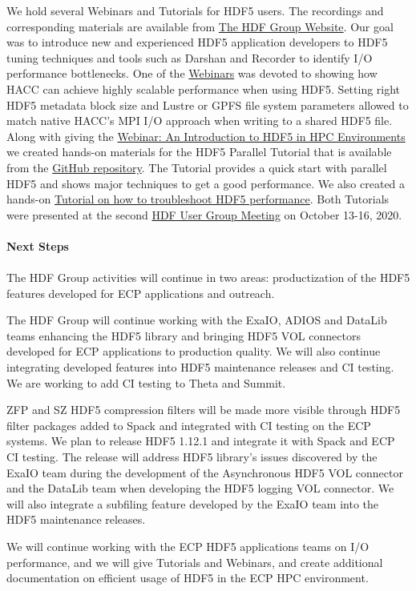 We hold several Webinars and Tutorials for HDF5 users. The recordings and corresponding materials are available from \href{http://https://www.hdfgroup.org/category/webinar} {The HDF Group Website}. Our goal was to introduce new and experienced HDF5 application developers to HDF5 tuning techniques and tools such as Darshan and Recorder to identify I/O performance bottlenecks. One of the \href{https://www.hdfgroup.org/2020/08/a-study-of-hacc-io-benchmarks/}{Webinars} was devoted to showing how HACC can achieve highly scalable performance when using HDF5. Setting right HDF5 metadata block size and Lustre or GPFS file system parameters allowed to match native HACC's MPI I/O approach when writing to a shared HDF5 file.
Along with giving the \href{https://www.hdfgroup.org/2020/06/webinar-an-introduction-to-hdf5-in-hpc-environments-supporting-materials/}{Webinar: An Introduction to HDF5 in HPC Environments} we created hands-on materials for the HDF5 Parallel Tutorial that is available from the \href{https://github.com/HDFGroup/Tutorial/tree/main/Parallel-hands-on-tutorial}{GitHub repository}. The Tutorial provides a quick start with parallel HDF5 and shows major techniques to get a good performance. We also created a hands-on \href{https://github.com/HDFGroup/Tutorial/tree/main/HDF5-troubleshooting}{Tutorial on how to troubleshoot HDF5 performance}. Both Tutorials were presented at the second \href{https://www.hdfgroup.org/hug/2020-hug/hdf5-users-group-2020-agenda/}{HDF User Group Meeting} on October 13-16, 2020. 
\paragraph{Next Steps}
\paragraph{}
The HDF Group activities will continue in two areas: productization of the HDF5 features developed for ECP applications and outreach.

The HDF Group will continue working with the ExaIO, ADIOS and DataLib teams enhancing the HDF5 library and bringing HDF5 VOL connectors developed for ECP applications to production quality. We will also continue integrating developed features into HDF5 maintenance releases and CI testing. We are working to add CI testing to Theta and Summit.

ZFP and SZ HDF5 compression filters will be made more visible through HDF5 filter packages added to Spack and integrated with CI testing on the ECP systems. We plan to release HDF5 1.12.1 and integrate it with Spack and ECP CI testing. The release will address HDF5 library's issues discovered by the ExaIO team during the development of the Asynchronous HDF5 VOL connector and the DataLib team when developing the HDF5 logging VOL connector. We will also integrate a subfiling feature developed by the ExaIO team into the HDF5 maintenance releases.

We will continue working with the ECP HDF5 applications teams on I/O performance, and we will give Tutorials and Webinars, and create additional documentation on efficient usage of HDF5 in the ECP HPC environment.